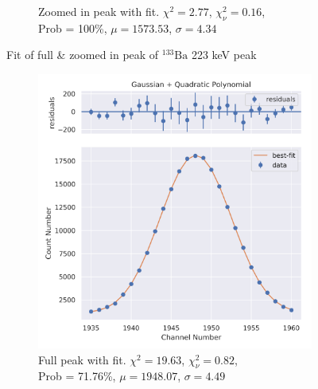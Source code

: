 \documentclass[11pt,a4paper]{article}
\newcommand{\element}[2]{$^{#2}\textrm{#1}$}
\begin{document}
\begin{figure}[H]
\begin{subfigure}{.5\linewidth}
    \caption{Zoomed in peak with fit. $\chi^2 = 2.77$, $\chi^2_\nu = 0.16$, \\ Prob = 100\%, $\mu = 1573.53$, $\sigma = 4.34$}
  \end{subfigure}
  \caption{Fit of full \& zoomed in peak of \element{Ba}{133} 223 keV peak}
\end{figure}
\begin{figure}[H]
  \centering
  \begin{subfigure}{.5\linewidth}
    \centering
    \includegraphics[width=\linewidth]{./Images/Barium133/Quad/Quad_4_Full.png}
    \caption{Full peak with fit. $\chi^2 = 19.63$, $\chi^2_\nu = 0.82$, \\ Prob = 71.76\%, $\mu = 1948.07$, $\sigma = 4.49$}
  \end{subfigure}%
  \begin{subfigure}{.5\linewidth}
    \centering

\end{subfigure}
\end{figure}
\end{document}
